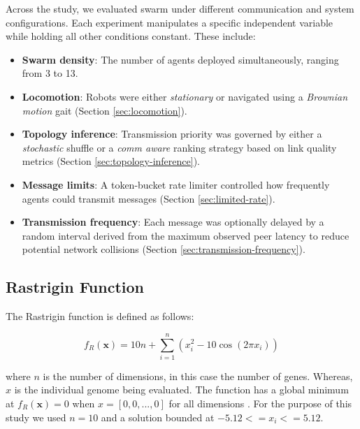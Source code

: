 \documentclass[conference]{IEEEtran}
\begin{document}
Across the study, we evaluated swarm under different communication and system configurations. Each experiment manipulates a specific independent variable while holding all other conditions constant. These include:\\

\begin{itemize}
  \item \textbf{Swarm density}: The number of agents deployed simultaneously, ranging from 3 to 13.
  \item \textbf{Locomotion}: Robots were either \emph{stationary} or navigated using a \emph{Brownian motion} gait (Section \ref{sec:locomotion}).
  \item \textbf{Topology inference}: Transmission priority was governed by either a \emph{stochastic} shuffle or a \emph{comm aware} ranking strategy based on link quality metrics (Section \ref{sec:topology-inference}).
  \item \textbf{Message limits}: A token-bucket rate limiter controlled how frequently agents could transmit messages (Section \ref{sec:limited-rate}).
  \item \textbf{Transmission frequency}: Each message was optionally delayed by a random interval derived from the maximum observed peer latency to reduce potential network collisions (Section \ref{sec:transmission-frequency}).
\end{itemize}

\subsection{Rastrigin Function}

The Rastrigin function is defined as follows:

\begin{equation}\label{eq:rastrigin}
f_R(\mathbf{x}) = 10n + \sum_{i=1}^{n} \left(x_i^2 - 10\cos(2\pi x_i)\right)
\end{equation}

where $n$ is the number of dimensions, in this case the number of genes. Whereas, $x$ is the individual genome being evaluated. The function has a global minimum at \( f_R(\mathbf{x}) = 0 \) when $x = [0, 0, ..., 0]$ for all dimensions \cite{rucinski_impact_2010}. For the purpose of this study we used $n = 10$ and a solution bounded at $-5.12<=x_i<=5.12$.
\end{document}
